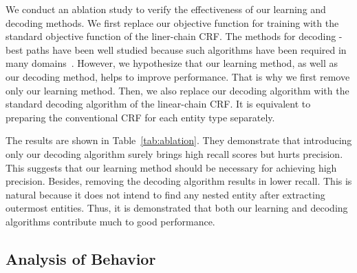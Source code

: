 \documentclass[11pt,a4paper]{article}
\def\tabref#1{Table~\ref{#1}}
\begin{document}
We conduct an ablation study to verify the effectiveness of our learning and decoding methods.
We first replace our objective function for training with the standard objective function of the liner-chain CRF.
The methods for decoding -best paths have been well studied because such algorithms have been required in many domains~\cite{soong-huang-1990-tree,kaji-etal-2010-efficient,huang-etal-2012-iterative}.
However, we hypothesize that our learning method, as well as our decoding method, helps to improve performance.
That is why we first remove only our learning method.
Then, we also replace our decoding algorithm with the standard decoding algorithm of the linear-chain CRF.
It is equivalent to preparing the conventional CRF for each entity type separately.

The results are shown in \tabref{tab:ablation}.
They demonstrate that introducing only our decoding algorithm surely brings high recall scores but hurts precision.
This suggests that our learning method should be necessary for achieving high precision. 
Besides, removing the decoding algorithm results in lower recall.
This is natural because it does not intend to find any nested entity after extracting outermost entities.
Thus, it is demonstrated that both our learning and decoding algorithms contribute much to good performance.

\subsection{Analysis of Behavior}

\begin{table}[t!]
\centering
\small
{}
\caption{Recall scores for gold annotations of each level.}\label{tab:level-wise-recall}
\end{table}
\end{document}
